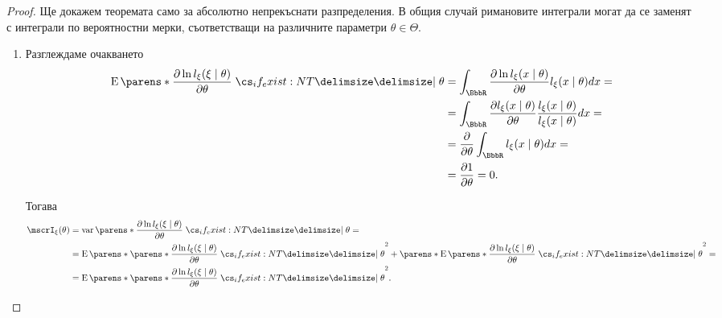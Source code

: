 \documentclass{../../common/topic}
\begin{document}
\begin{proof}
  Ще докажем теоремата само за абсолютно непрекъснати разпределения. В общия случай римановите интеграли могат да се заменят с интеграли по вероятностни мерки, съответстващи на различните параметри \( \theta \in \Theta \).
  \begin{enumerate}
    \item Разглеждаме очакването
    \begin{align*}
      \Expect\parens*{ \frac {\partial \ln l_\xi(\xi \given \theta)} {\partial \theta} \given* \theta }
      &=
      \int_{\BbbR} \frac {\partial \ln l_\xi(x \given \theta)} {\partial \theta} l_\xi(x \given \theta) dx
      = \\ &=
      \int_{\BbbR} \frac {\partial l_\xi(x \given \theta)} {\partial \theta} \frac {l_\xi(x \given \theta)} {l_\xi(x \given \theta)} dx
      = \\ &=
      \frac \partial {\partial \theta} \int_{\BbbR} l_\xi(x \given \theta) dx
      = \\ &=
      \frac {\partial 1} {\partial \theta}
      =
      0.
    \end{align*}

    Тогава
    \begin{align*}
      \mscrI_\xi(\theta)
      &=
      \var\parens*{ \frac {\partial \ln l_\xi(\xi \given \theta)} {\partial \theta} \given* \theta }
      = \\ &=
      \Expect\parens*{ {\parens*{ \frac {\partial \ln l_\xi(\xi \given \theta)} {\partial \theta} \given* \theta }}^2 } + {\parens*{\Expect\parens*{ \frac {\partial \ln l_\xi(\xi \given \theta)} {\partial \theta} \given* \theta }}}^2
      = \\ &=
      \Expect\parens*{ {\parens*{ \frac {\partial \ln l_\xi(\xi \given \theta)} {\partial \theta} \given* \theta }}^2 }.
    \end{align*}


\end{enumerate}
\end{proof}
\end{document}

